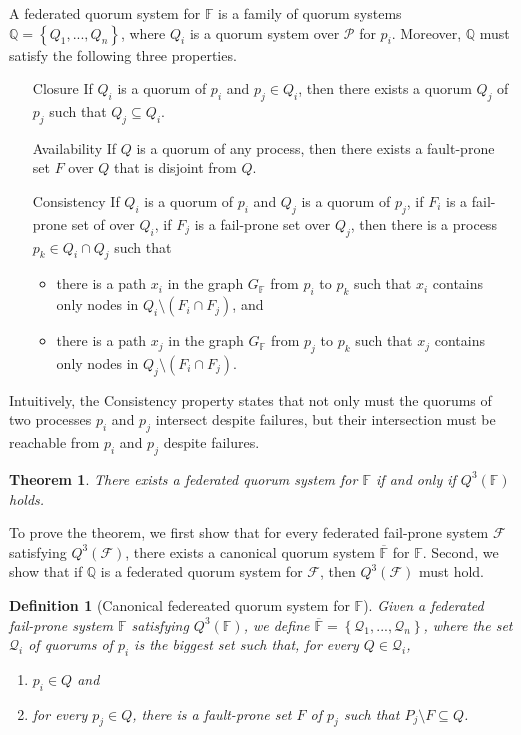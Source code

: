 \documentclass[11pt]{article}
\newtheorem{definition}{Definition}
\newtheorem{thm}{Theorem}
\begin{document}
A federated quorum system for $\mathbb{F}$ is a family of quorum systems $\mathbb{Q}=\left\{Q_1,...,Q_n\right\}$, where $Q_i$ is a quorum system over $\mathcal{P}$ for $p_i$. Moreover, $\mathbb{Q}$ must satisfy the following three properties.
\begin{itemize}
  \item [Closure] If $Q_i$ is a quorum of $p_i$ and $p_j\in Q_i$, then there exists a quorum $Q_j$ of $p_j$ such that $Q_j\subseteq Q_i$.
  \item [Availability] If $Q$ is a quorum of any process, then there exists a fault-prone set $F$ over $Q$ that is disjoint from $Q$.
  \item[Consistency] If $Q_i$ is a quorum of $p_i$ and $Q_j$ is a quorum of $p_j$, if $F_i$ is a fail-prone set of over $Q_i$, if $F_j$ is a fail-prone set over $Q_j$, then there is a process $p_k\in Q_i\cap Q_j$ such that
    \begin{itemize}
      \item there is a path $x_i$ in the graph $G_\mathbb{F}$ from $p_i$ to $p_k$ such that $x_i$ contains only nodes in $Q_i\setminus (F_i \cap F_j)$, and
      \item there is a path $x_j$ in the graph $G_\mathbb{F}$ from $p_j$ to $p_k$ such that $x_j$ contains only nodes in $Q_j\setminus (F_i \cap F_j)$.
    \end{itemize}
\end{itemize}

Intuitively, the Consistency property states that not only must the quorums of two processes $p_i$ and $p_j$ intersect despite failures, but their intersection must be reachable from $p_i$ and $p_j$ despite failures.

\begin{thm}
  There exists a federated quorum system for $\mathbb{F}$ if and only if $Q^3(\mathbb{F})$ holds.
\end{thm}

To prove the theorem, we first show that for every federated fail-prone system $\mathcal{F}$ satisfying $Q^3(\mathcal{F})$, there exists a canonical quorum system $\overline{\mathbb{F}}$ for $\mathbb{F}$. Second, we show that if $\mathbb{Q}$ is a federated quorum system for $\mathcal{F}$, then $Q^3(\mathcal{F})$ must hold.

\begin{definition}[Canonical federeated quorum system for $\mathbb{F}$]
Given a federated fail-prone system $\mathbb{F}$ satisfying $Q^3(\mathbb{F})$, we define $\overline{\mathbb{F}}=\left\{\mathcal{Q}_1,...,\mathcal{Q}_n\right\}$, where the set $\mathcal{Q}_i$ of quorums of $p_i$ is the biggest set such that, for every $Q\in\mathcal{Q}_i$,
\begin{enumerate}
  \item $p_i\in Q$ and
  \item for every $p_j\in Q$, there is a fault-prone set $F$ of $p_j$ such that $P_j\setminus F\subseteq Q$.
\end{enumerate}
\end{definition}
\end{document}

